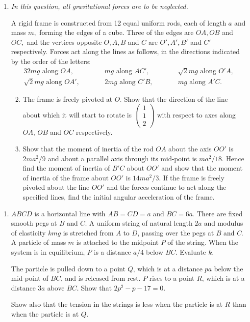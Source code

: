 \documentclass[a4, 11pt]{report}
\newlength{\qspace}
\newcounter{qnumber}
\newenvironment{question}%
 {\vspace{\qspace}
  \begin{enumerate}[\bfseries 1\quad][10]%
    \setcounter{enumi}{\value{qnumber}}%
    \item%
 }
{
  \end{enumerate}
  \filbreak
  \stepcounter{qnumber}
 }
\newenvironment{questionparts}[1][1]%
 {
  \begin{enumerate}[\bfseries (i)]%
    \setcounter{enumii}{#1}
    \addtocounter{enumii}{-1}
    \setlength{\itemsep}{5mm}
    \setlength{\parskip}{8pt}
 }
 {
  \end{enumerate}
 }
\begin{document}
	
\begin{question}
\textit{In this question, all gravitational forces are to be neglected. }


A rigid frame is constructed from 12 equal uniform rods, each of length
$a$ and mass $m,$ forming the edges of a cube. Three of the edges
are $OA,OB$ and $OC,$ and the vertices opposite $O,A,B$ and $C$
are $O',A',B'$ and $C'$ respectively. Forces act along the lines
as follows, in the directions indicated by the order of the letters:
\begin{alignat*}{3}
2mg\mbox{ along }OA, & \qquad & mg\mbox{ along }AC', & \qquad & \sqrt{2}mg\mbox{ along }O'A,\\
\sqrt{2}mg\mbox{ along }OA', &  & 2mg\mbox{ along }C'B, &  & mg\mbox{ along }A'C.
\end{alignat*}

\begin{questionparts}
\item The frame is freely pivoted at $O$. Show that the direction of the line
about which it will start to rotate is
$\begin{pmatrix}1\\
1\\
2
\end{pmatrix}$ with respect to axes
along $OA$, $OB$ and $OC$ respectively.

\item Show that the moment of inertia of the rod 
$OA$ about the axis $OO'$ is $2ma^2/9$ and about a parallel axis through
 its mid-point is $ma^2/18$. Hence find the 
moment of inertia of $B'C$ about $OO'$ and show that the moment of inertia
of the frame about $OO'$ is $14ma^2/3$.  If the frame
 is freely pivoted about the line $OO'$ and the forces continue 
to act along the specified lines, find the initial angular 
acceleration of the frame.   
\end{questionparts}
	\end{question}
	
\begin{question}	
$ABCD$ is a horizontal line with 
$AB=CD=a$ and $BC=6a$. 
There are
fixed smooth pegs at $B$ and $C$.
A uniform string of natural length $2a$ and modulus of elasticity
$kmg$ is stretched from $A$ to $D$, passing over the pegs at 
$B$ and $C$. A particle of mass $m$ is attached to the midpoint $P$
of the string.  When the
system is in equilibrium, $P$ is a distance $a/4$ below $BC$. Evaluate
$k$.

The particle is pulled down to a point $Q$, which is
at a distance $pa$ below
the mid-point of $BC$, and is released from rest. $P$ rises to 
a point $R$, which is at 
 a distance $3a$ above $BC$. Show that $2p^2-p-17=0$.

Show also that the tension in the strings is less when the 
particle is at $R$ than when the particle is at $Q$.
\end{question}
\end{document}
